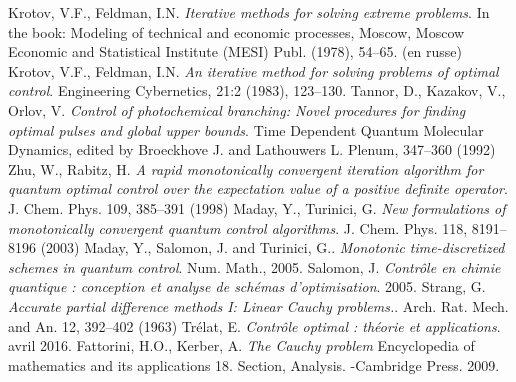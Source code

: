 

\begin{thebibliography}{KNU90}
 Krotov, V.F., Feldman, I.N.
\emph{Iterative methods for solving extreme problems}. In the
book: Modeling of technical and economic processes, Moscow, Moscow Economic and Statistical Institute (MESI) Publ. (1978), 54–65. (en russe)
\vspace{0.5cm}
 Krotov, V.F., Feldman, I.N.
\emph{An iterative method for solving problems of optimal control}. Engineering Cybernetics, 21:2 (1983), 123–130.
\vspace{0.5cm}
 Tannor, D., Kazakov, V., Orlov, V.
\emph{Control of photochemical branching: Novel procedures for finding optimal pulses and global upper bounds}. Time Dependent Quantum Molecular Dynamics, edited by Broeckhove J. and Lathouwers L. Plenum, 347–360 (1992)
\vspace{0.5cm}
 Zhu, W., Rabitz, H.
\emph{A rapid monotonically convergent iteration algorithm for quantum optimal control over the expectation value of a positive definite operator}. J. Chem. Phys. 109, 385–391 (1998)
\vspace{0.5cm}
 Maday, Y., Turinici, G. 
\emph{New formulations of monotonically convergent quantum control algorithms}. J. Chem. Phys. 118, 8191–8196 (2003)
\vspace{0.5cm}
 Maday, Y., Salomon, J. and Turinici, G..
\emph{Monotonic time-discretized schemes in quantum control}. Num. Math., 2005.
\vspace{0.5cm}
 Salomon, J.
\emph{Contrôle en chimie quantique : conception et analyse de schémas d’optimisation}. 2005.
\vspace{0.5cm}
 Strang, G. 
\emph{Accurate partial difference methods I: Linear Cauchy problems.}. Arch. Rat. Mech. and An. 12, 392–402 (1963)
\vspace{0.5cm}
 Trélat, E.
\emph{Contrôle optimal : théorie et applications}. avril 2016.
\vspace{0.5cm}
 Fattorini, H.O., Kerber, A.
\emph{The Cauchy problem} Encyclopedia of mathematics and its applications 18. Section, Analysis. -Cambridge Press. 2009.

\end{thebibliography}
